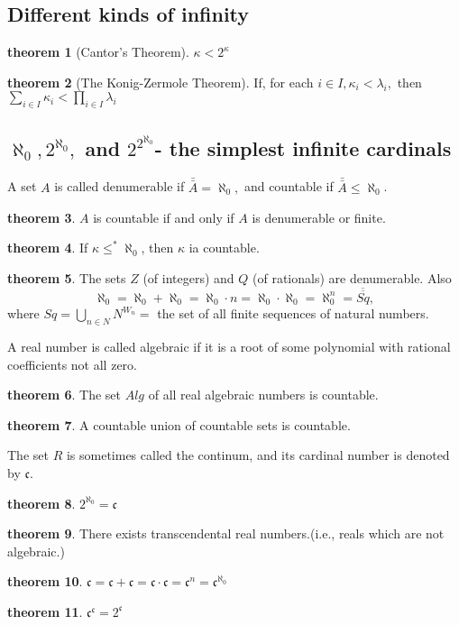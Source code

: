 \documentclass[a4paper,11pt]{article}%
\theoremstyle{remark}
\theoremstyle{definition}
\newtheorem{theorem}{theorem}[section]
\theoremstyle{definition}
\theoremstyle{plain}
\theoremstyle{definition}
\begin{document}
\subsection{Different kinds of infinity}
\begin{theorem}[Cantor's Theorem]
   $\kappa<2^{\kappa}$ 
\end{theorem}
\begin{theorem}[The Konig-Zermole Theorem]
   If, for each $i\in I,\kappa_i<\lambda_i,$ then $\sum_{i\in I}\kappa_i<\prod_{i\in I}\lambda_i$ 
\end{theorem}
\subsection{$\aleph_0,2^{\aleph_0},$ and $2^{2^{\aleph_0}}$- the simplest infinite cardinals}
A set $A$ is called denumerable if $\bar{\bar{A}}=\aleph_0,$ and countable if $\bar{\bar{A}}\leq \aleph_0$.
\begin{theorem}
    $A$ is countable if and only if $A$ is denumerable or finite.
\end{theorem}
\begin{theorem}
    If $\kappa\leq^*\aleph_0$, then $\kappa$ ia countable.
\end{theorem}
\begin{theorem}
    The sets $Z$ (of integers) and $Q$ (of rationals) are denumerable.
    Also
    \[\aleph_0=\aleph_0+\aleph_0=\aleph_0\cdot n=\aleph_0\cdot\aleph_0=\aleph_0^n=\overline{\overline{Sq}},\]
    where $Sq=\bigcup_{n\in N}N^{W_n}=$ the set of all finite sequences of natural numbers.
\end{theorem}
A real number is called algebraic if it is a root of some polynomial with rational
coefficients not all zero.
\begin{theorem}
    The set $Alg$ of all real algebraic numbers is countable.
\end{theorem}
\begin{theorem}
    A countable union of countable sets is countable.
\end{theorem}
The set $R$ is sometimes called the continum, and its cardinal number is 
denoted by $\mathfrak{c}$.
\begin{theorem}
    $2^{\aleph_0}=\mathfrak{c}$
\end{theorem}
\begin{theorem}
    There exists transcendental real numbers.(i.e., reals which are not algebraic.)
\end{theorem}
\begin{theorem}
    $\mathfrak{c}=\mathfrak{c}+\mathfrak{c}=\mathfrak{c}\cdot\mathfrak{c}=\mathfrak{c}^n=\mathfrak{c}^{\aleph_0}$
\end{theorem}
\begin{theorem}
    $\mathfrak{c}^{\mathfrak{c}}=2^{\mathfrak{c}}$
\end{theorem}
\end{document}
